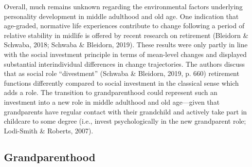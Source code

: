 \documentclass[
  english,
  man, noextraspace]{apa7}
\begin{document}
Overall, much remains unknown regarding the environmental factors underlying personality development in middle adulthood and old age. One indication that age-graded, normative life experiences contribute to change following a period of relative stability in midlife is offered by recent research on retirement (Bleidorn \& Schwaba, 2018; Schwaba \& Bleidorn, 2019). These results were only partly in line with the social investment principle in terms of mean-level changes and displayed substantial interindividual differences in change trajectories. The authors discuss that as social role \enquote{divestment} (Schwaba \& Bleidorn, 2019, p. 660) retirement functions differently compared to social investment in the classical sense which adds a role. The transition to grandparenthood could represent such an investment into a new role in middle adulthood and old age---given that grandparents have regular contact with their grandchild and actively take part in childcare to some degree (i.e., invest psychologically in the new grandparent role; Lodi-Smith \& Roberts, 2007).

\hypertarget{grandparenthood}{%
\subsection{Grandparenthood}\label{grandparenthood}}
\end{document}
